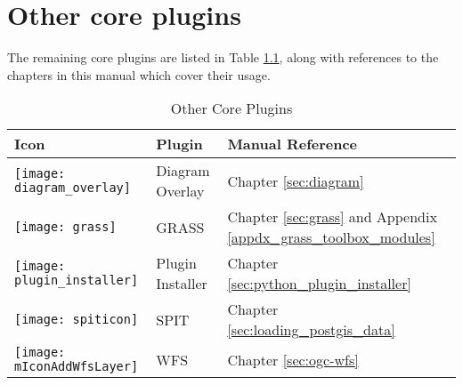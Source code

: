 
\chapter{Other core plugins}


The remaining core plugins are listed in Table \ref{tab:other_core}, along with references to 
the chapters in this manual which cover their usage.

\begin{table}[H]
\centering
 \begin{tabular}{|l|l|p{8cm}|}
\hline \textbf{Icon} & \textbf{Plugin} & \textbf{Manual Reference}\\
\hline
\texttt{[image: diagram\_overlay]}
 & Diagram Overlay \index{plugins!diagram}& Chapter \ref{sec:diagram}\\
\hline
\texttt{[image: grass]}
 & GRASS \index{plugin!grass toolbox} & Chapter \ref{sec:grass} and Appendix \ref{appdx_grass_toolbox_modules}\\
 \hline
\texttt{[image: plugin\_installer]}
 & Plugin Installer \index{plugins!Plugin Installer} & Chapter \ref{sec:python_plugin_installer}\\
\hline
\texttt{[image: spiticon]}
 & SPIT \index{plugins!spit}& Chapter \ref{sec:loading_postgis_data} \\
 \hline
\texttt{[image: mIconAddWfsLayer]}
 & WFS & Chapter \ref{sec:ogc-wfs} \\
\hline
\end{tabular}
\caption{Other Core Plugins}\label{tab:other_core}
\end{table}

